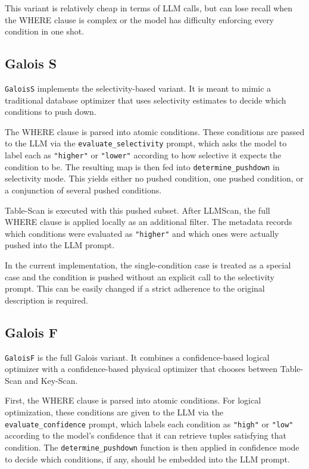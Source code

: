 \documentclass[11pt]{article}
\begin{document}
This variant is relatively cheap in terms of LLM calls, but can lose recall when the WHERE clause is complex or the model has difficulty enforcing every condition in one shot.

\subsection{Galois S}

\texttt{GaloisS} implements the selectivity-based variant. It is meant to mimic a traditional database optimizer that uses selectivity estimates to decide which conditions to push down.

The WHERE clause is parsed into atomic conditions. These conditions are passed to the LLM via the \texttt{evaluate\_selectivity} prompt, which asks the model to label each as \texttt{"higher"} or \texttt{"lower"} according to how selective it expects the condition to be. The resulting map is then fed into \texttt{determine\_pushdown} in selectivity mode. This yields either no pushed condition, one pushed condition, or a conjunction of several pushed conditions.

Table-Scan is executed with this pushed subset. After LLMScan, the full WHERE clause is applied locally as an additional filter. The metadata records which conditions were evaluated as \texttt{"higher"} and which ones were actually pushed into the LLM prompt.

In the current implementation, the single-condition case is treated as a special case and the condition is pushed without an explicit call to the selectivity prompt. This can be easily changed if a strict adherence to the original description is required.

\subsection{Galois F}

\texttt{GaloisF} is the full Galois variant. It combines a confidence-based logical optimizer with a confidence-based physical optimizer that chooses between Table-Scan and Key-Scan.

First, the WHERE clause is parsed into atomic conditions. For logical optimization, these conditions are given to the LLM via the \texttt{evaluate\_confidence} prompt, which labels each condition as \texttt{"high"} or \texttt{"low"} according to the model's confidence that it can retrieve tuples satisfying that condition. The \texttt{determine\_pushdown} function is then applied in confidence mode to decide which conditions, if any, should be embedded into the LLM prompt.
\end{document}

